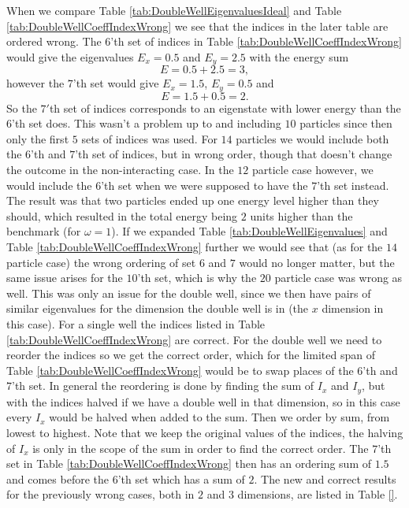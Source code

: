 \documentclass[../main.tex]{subfiles}
\begin{document}
When we compare Table \ref{tab:DoubleWellEigenvaluesIdeal} and Table \ref{tab:DoubleWellCoeffIndexWrong} we see that the indices in the later table are ordered wrong. The $6$'th set of indices in Table \ref{tab:DoubleWellCoeffIndexWrong} would give the eigenvalues $E_x = 0.5$ and $E_y = 2.5$ with the energy sum 
\begin{equation}
    E = 0.5 + 2.5 = 3,
\end{equation}
however the $7$'th set would give $E_x = 1.5$, $E_y = 0.5$ and 
\begin{equation}
    E = 1.5 + 0.5 = 2.
\end{equation}
So the $7'$th set of indices corresponds to an eigenstate with lower energy than the $6$'th set does. This wasn't a problem up to and including $10$ particles since then only the first $5$ sets of indices was used. For $14$ particles we would include both the $6$'th and $7$'th set of indices, but in wrong order, though that doesn't change the outcome in the non-interacting case. In the $12$ particle case however, we would include the $6$'th set when we were supposed to have the $7$'th set instead. The result was that two particles ended up one energy level higher than they should, which resulted in the total energy being $2$ units higher than the benchmark (for $\omega=1$). If we expanded Table \ref{tab:DoubleWellEigenvalues} and Table \ref{tab:DoubleWellCoeffIndexWrong} further we would see that (as for the $14$ particle case) the wrong ordering of set $6$ and $7$ would no longer matter, but the same issue arises for the $10$'th set, which is why the $20$ particle case was wrong as well. This was only an issue for the double well, since we then have pairs of similar eigenvalues for the dimension the double well is in (the $x$ dimension in this case). For a single well the indices listed in Table \ref{tab:DoubleWellCoeffIndexWrong} are correct. For the double well we need to reorder the indices so we get the correct order, which for the limited span of Table \ref{tab:DoubleWellCoeffIndexWrong} would be to swap places of the $6$'th and $7$'th set. In general the reordering is done by finding the sum of $I_x$ and $I_y$, but with the indices halved if we have a double well in that dimension, so in this case every $I_x$ would be halved when added to the sum. Then we order by sum, from lowest to highest. Note that we keep the original values of the indices, the halving of $I_x$ is only in the scope of the sum in order to find the correct order. The $7$'th set in Table \ref{tab:DoubleWellCoeffIndexWrong} then has an ordering sum of $1.5$ and comes before the $6$'th set which has a sum of $2$. The new and correct results for the previously wrong cases, both in $2$ and $3$ dimensions, are listed in Table \ref{}.
\end{document}
